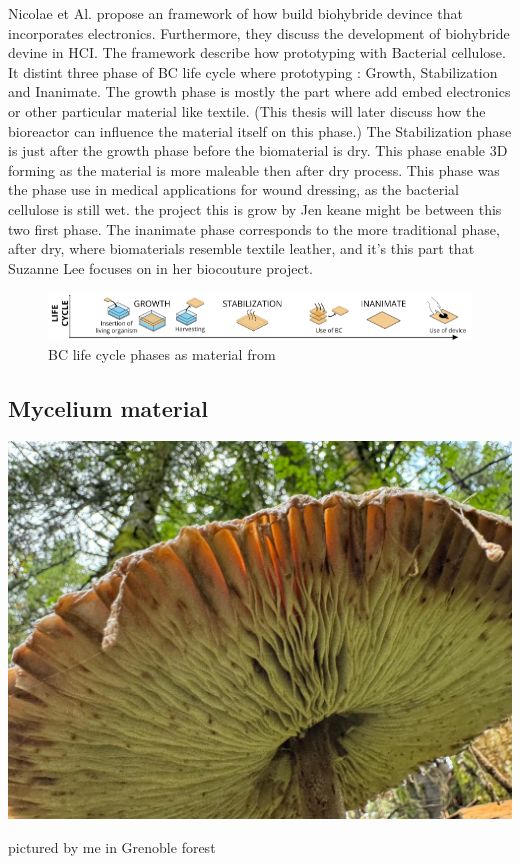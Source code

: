 Nicolae et Al. propose an framework \cite{nicolae2023biohybrid} of how build biohybride devince that incorporates electronics. 
Furthermore, they discuss the development of biohybride devine in HCI. The framework describe how prototyping with Bacterial cellulose. It distint three phase of BC life cycle where prototyping : Growth, Stabilization and Inanimate. 
The growth phase is mostly the part where add embed electronics or other particular material like textile. (This thesis will later discuss how the bioreactor can influence the material itself on this phase.)
The Stabilization phase is just after the growth phase before the biomaterial is dry. This phase enable 3D forming as the material is more maleable then after dry process. This phase was the phase use in medical applications for wound dressing, as the bacterial cellulose is still wet. the project this is grow by Jen keane might be between this two first phase.
The inanimate phase corresponds to the more traditional phase, after dry, where biomaterials resemble textile leather, and it's this part that Suzanne Lee focuses on in her biocouture project. 

\begin{figure}[h]
    \centering
    \includegraphics[width=1.4\textwidth]{images/phase-proto.png}
    \caption{BC life cycle phases as material from\cite{nicolae2023biohybrid}}
    \label{fig:life cycle}
\end{figure}




\subsection{Mycelium material}

\begin{marginfigure}
    \centering
    \includegraphics{images/champi.png}    
    \caption{pictured by me in Grenoble forest}
    \label{fig:champi}
\end{marginfigure}


